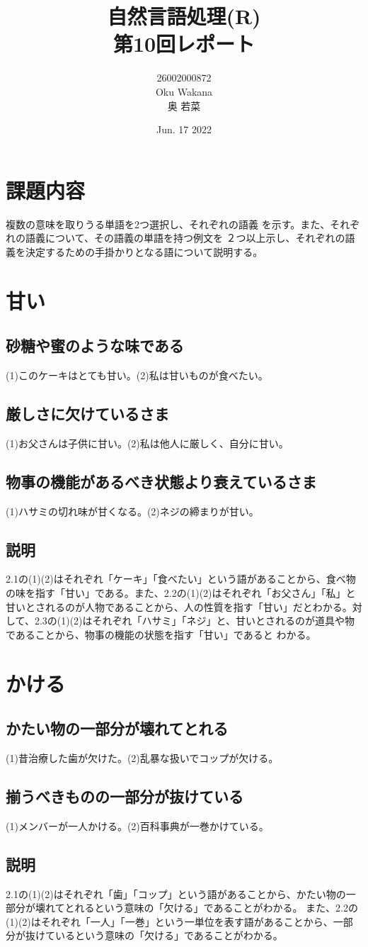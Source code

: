 \documentclass[dvipdfmx,autodetect-engine,titlepage]{jsarticle}
\title{自然言語処理(R)\\
第10回レポート\\
}
\author{26002000872\\Oku Wakana\\奥 若菜}
\date{Jun. 17 2022}
\begin{document}
\maketitle

\section{課題内容}
複数の意味を取りうる単語を2つ選択し、それぞれの語義
を示す。また、それぞれの語義について、その語義の単語を持つ例文を
２つ以上示し、それぞれの語義を決定するための手掛かりとなる語について説明する。\\


\section{甘い}
\subsection{砂糖や蜜のような味である}
(1)このケーキはとても甘い。(2)私は甘いものが食べたい。

\subsection{厳しさに欠けているさま}
(1)お父さんは子供に甘い。(2)私は他人に厳しく、自分に甘い。

\subsection{物事の機能があるべき状態より衰えているさま}
(1)ハサミの切れ味が甘くなる。(2)ネジの締まりが甘い。

\subsection{説明}
2.1の(1)(2)はそれぞれ「ケーキ」「食べたい」という語があることから、食べ物の味を指す「甘い」である。また、2.2の(1)(2)はそれぞれ「お父さん」「私」と
甘いとされるのが人物であることから、人の性質を指す「甘い」だとわかる。対して、2.3の(1)(2)はそれぞれ「ハサミ」「ネジ」と、甘いとされるのが道具や物であることから、物事の機能の状態を指す「甘い」であると
わかる。\\


\section{かける}
\subsection{かたい物の一部分が壊れてとれる}
(1)昔治療した歯が欠けた。(2)乱暴な扱いでコップが欠ける。
\subsection{揃うべきものの一部分が抜けている}
(1)メンバーが一人かける。(2)百科事典が一巻かけている。
\subsection{説明}
2.1の(1)(2)はそれぞれ「歯」「コップ」という語があることから、かたい物の一部分が壊れてとれるという意味の「欠ける」であることがわかる。
また、2.2の(1)(2)はそれぞれ「一人」「一巻」という一単位を表す語があることから、一部分が抜けているという意味の「欠ける」であることがわかる。
\end{document}

